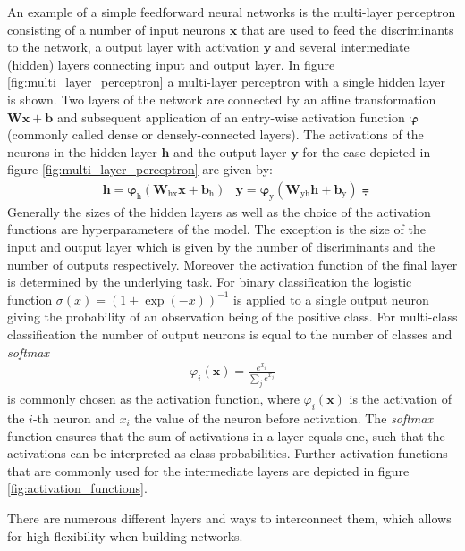 An example of a simple feedforward neural networks is the multi-layer perceptron
consisting of a number of input neurons $\mathbf{x}$ that are used to feed the
discriminants to the network, a output layer with activation $\mathbf{y}$ and
several intermediate (hidden) layers connecting input and output layer. In
figure \ref{fig:multi_layer_perceptron} a multi-layer perceptron with a single
hidden layer is shown. Two layers of the network are connected by an affine
transformation $\mathbf{W}\mathbf{x} + \mathbf{b}$ and subsequent application of
an entry-wise activation function $\bm{\varphi}$ (commonly called dense or
densely-connected layers). The activations of the neurons in the hidden layer
$\mathbf{h}$ and the output layer $\mathbf{y}$ for the case depicted in figure
\ref{fig:multi_layer_perceptron} are given by:
\begin{align*}
  &\mathbf{h} = \bm{\varphi}_{\text{h}}(\mathbf{W}_{\text{hx}} \mathbf{x} + \mathbf{b}_{\text{h}})
  &\mathbf{y} = \bm{\varphi}_{\text{y}}(\mathbf{W}_{\text{yh}} \mathbf{h} + \mathbf{b}_{\text{y}}) \eqdot
\end{align*}
Generally the sizes of the hidden layers as well as the choice of the activation
functions are hyperparameters of the model. The exception is the size of the
input and output layer which is given by the number of discriminants and the
number of outputs respectively. Moreover the activation function of the final
layer is determined by the underlying task. For binary classification the
logistic function $\sigma(x) = (1 + \exp(-x))^{-1}$ is applied to a single
output neuron giving the probability of an observation being of the positive
class. For multi-class classification the number of output neurons is equal to
the number of classes and \emph{softmax}
\begin{align*}
  \varphi_i(\mathbf{x}) = \frac{e^{x_i}}{\sum_j e^{x_j}}
\end{align*}
is commonly chosen as the activation function, where $\varphi_i(\mathbf{x})$ is
the activation of the $i$-th neuron and $x_i$ the value of the neuron before
activation. The \emph{softmax} function ensures that the sum of activations in a
layer equals one, such that the activations can be interpreted as class
probabilities. Further activation functions that are commonly used for the
intermediate layers are depicted in figure \ref{fig:activation_functions}.

There are numerous different layers and ways to interconnect them, which allows
for high flexibility when building networks.

